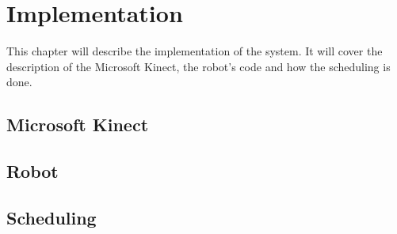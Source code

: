 \chapter{Implementation}
\label{chap:Implementation}
This chapter will describe the implementation of the system. It will cover the description of the Microsoft Kinect, the robot's code and how the scheduling is done. 

\section{Microsoft Kinect}
\label{sec:Microsoft Kinect Implementation}

\section{Robot}
\label{sec:Robot}

\section{Scheduling}
\label{sec:Scheduling implementation}